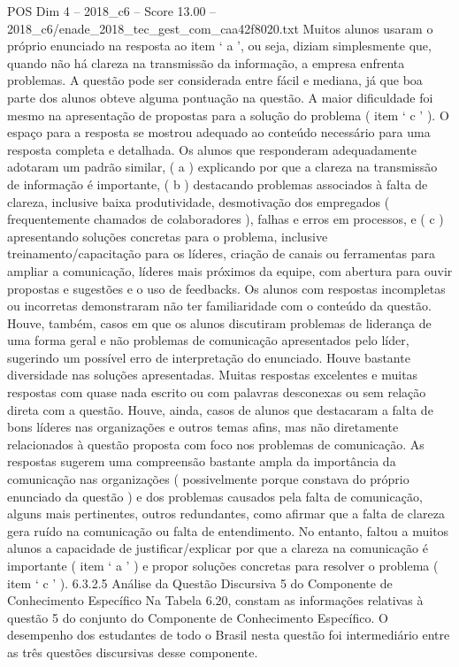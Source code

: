 \begin{textsample}{POS Dim 4 – 2018\_c6 – Score 13.00 – 2018\_c6/enade\_2018\_tec\_gest\_com\_caa42f8020.txt}
Muitos alunos usaram o próprio enunciado na resposta ao item ‘ a ’, ou seja, diziam simplesmente que, quando não há clareza na transmissão da informação, a empresa enfrenta problemas.
A questão pode ser considerada entre fácil e mediana, já que boa parte dos alunos obteve alguma pontuação na questão.
A maior dificuldade foi mesmo na apresentação de propostas para a solução do problema ( item ‘ c ’ ).
O espaço para a resposta se mostrou adequado ao conteúdo necessário para uma resposta completa e detalhada.
Os alunos que responderam adequadamente adotaram um padrão similar, ( a ) explicando por que a clareza na transmissão de informação é importante, ( b ) destacando problemas associados à falta de clareza, inclusive baixa produtividade, desmotivação dos empregados ( frequentemente chamados de colaboradores ), falhas e erros em processos, e ( c ) apresentando soluções concretas para o problema, inclusive treinamento/capacitação para os líderes, criação de canais ou ferramentas para ampliar a comunicação, líderes mais próximos da equipe, com abertura para ouvir propostas e sugestões e o uso de feedbacks.
Os alunos com respostas incompletas ou incorretas demonstraram não ter familiaridade com o conteúdo da questão.
Houve, também, casos em que os alunos discutiram problemas de liderança de uma forma geral e não problemas de comunicação apresentados pelo líder, sugerindo um possível erro de interpretação do enunciado.
Houve bastante diversidade nas soluções apresentadas.
Muitas respostas excelentes e muitas respostas com quase nada escrito ou com palavras desconexas ou sem relação direta com a questão.
Houve, ainda, casos de alunos que destacaram a falta de bons líderes nas organizações e outros temas afins, mas não diretamente relacionados à questão proposta com foco nos problemas de comunicação.
As respostas sugerem uma compreensão bastante ampla da importância da comunicação nas organizações ( possivelmente porque constava do próprio enunciado da questão ) e dos problemas causados pela falta de comunicação, alguns mais pertinentes, outros redundantes, como afirmar que a falta de clareza gera ruído na comunicação ou falta de entendimento.
No entanto, faltou a muitos alunos a capacidade de justificar/explicar por que a clareza na comunicação é importante ( item ‘ a ’ ) e propor soluções concretas para resolver o problema ( item ‘ c ’ ). 6.3.2.5 Análise da Questão Discursiva 5 do Componente de Conhecimento Específico Na Tabela 6.20, constam as informações relativas à questão 5 do conjunto do Componente de Conhecimento Específico.
O desempenho dos estudantes de todo o Brasil nesta questão foi intermediário entre as três questões discursivas desse componente.

\end{textsample}
